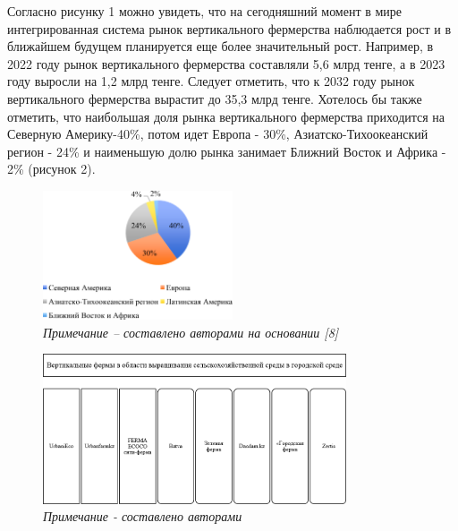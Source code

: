 \begin{multicols}{2}
Согласно рисунку 1 можно увидеть, что на сегодняшний момент в мире
интегрированная система рынок вертикального фермерства наблюдается рост
и в ближайшем будущем планируется еще более значительный рост. Например,
в 2022 году рынок вертикального фермерства составляли 5,6 млрд тенге, а
в 2023 году выросли на 1,2 млрд тенге. Следует отметить, что к 2032 году
рынок вертикального фермерства вырастит до 35,3 млрд тенге. Хотелось бы
также отметить, что наибольшая доля рынка вертикального фермерства
приходится на Северную Америку-40\%, потом идет Европа - 30\%,
Азиатско-Тихоокеанский регион - 24\% и наименьшую долю рынка занимает
Ближний Восток и Африка - 2\% (рисунок 2).
\end{multicols}

\begin{figure}[H]
	\centering
	\includegraphics[width=0.5\textwidth]{media/ekon4/image11}
	\caption*{Рис.2 - Мировая доля рынка вертикального фермерство, млрд долларов США}
	\caption*{\normalfont\emph{Примечание -- составлено авторами на основании {[}8{]}}}
\end{figure}

\begin{figure}[H]
	\centering
	\includegraphics[width=0.8\textwidth]{media/ekon4/image22}
	\caption*{Рис.3 - Примеры интегрированных систем вертикальных ферм в области выращивания сельскохозяйственной среды в городской среде в Казахстане}
	\caption*{\normalfont\emph{Примечание - составлено авторами}}
\end{figure}


